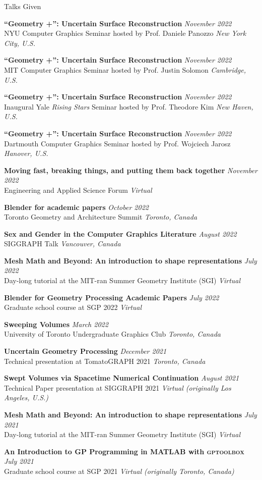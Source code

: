 \documentclass{resume}
\newcommand{\talk}[4]{
    {\bf #1} \hfill {\em \small #2} \\ %
    {\small #3} \hfill {\em \small #4}
}
\begin{document}
\begin{rSection}{Talks Given}
\talk{``Geometry +'': Uncertain Surface Reconstruction}{November 2022}{NYU Computer Graphics Seminar hosted by Prof. Daniele Panozzo}{New York City, U.S.}

\talk{``Geometry +'': Uncertain Surface Reconstruction}{November 2022}{MIT Computer Graphics Seminar hosted by Prof. Justin Solomon}{Cambridge, U.S.}

\talk{``Geometry +'': Uncertain Surface Reconstruction}{November 2022}{Inaugural Yale \textit{Rising Stars} Seminar hosted by Prof. Theodore Kim}{New Haven, U.S.}


\talk{``Geometry +'': Uncertain Surface Reconstruction}{November 2022}{Dartmouth Computer Graphics Seminar hosted by Prof. Wojciech Jarosz}{Hanover, U.S.}

\talk{Moving fast, breaking things, and putting them back together}{November 2022}{Engineering and Applied Science Forum}{Virtual}

\talk{Blender for academic papers}{October 2022}{Toronto Geometry and Architecture Summit}{Toronto, Canada}

\talk{Sex and Gender in the Computer Graphics Literature}{August 2022}{SIGGRAPH Talk}{Vancouver, Canada}

\talk{Mesh Math and Beyond: An introduction to shape representations}{July 2022}{Day-long tutorial at the MIT-ran Summer Geometry Institute (SGI)}{Virtual}

\talk{Blender for Geometry Processing Academic Papers}{July 2022}{Graduate school course at SGP 2022}{Virtual}

\talk{Sweeping Volumes}{March 2022}
{University of Toronto Undergraduate Graphics Club}{Toronto, Canada}

\talk{Uncertain Geometry Processing}{December 2021}
{Technical presentation at TomatoGRAPH 2021}{Toronto, Canada}

\talk{Swept Volumes via Spacetime Numerical Continuation}{August 2021}
{Technical Paper presentation at SIGGRAPH 2021}{Virtual (originally Los Angeles, U.S.)}

\talk{Mesh Math and Beyond: An introduction to shape representations}{July 2021}
{Day-long tutorial at the MIT-ran Summer Geometry Institute (SGI)}{Virtual}

\talk{An Introduction to GP Programming in MATLAB with \textsc{gptoolbox}}{July 2021}
{Graduate school course at SGP 2021}{Virtual (originally Toronto, Canada)}


\end{rSection}
\end{document}
